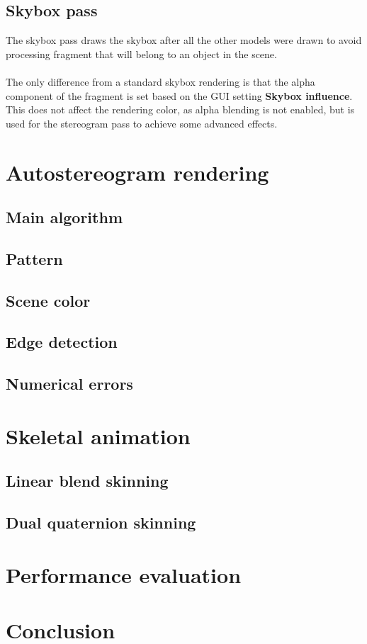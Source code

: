 \documentclass[12pt, a4paper]{article}
\begin{document}
\subsection{Skybox pass}
The skybox pass draws the skybox after all the other models were drawn to avoid processing fragment that will belong to an object
in the scene.\\\\
The only difference from a standard skybox rendering is that the alpha component of the fragment is set based
on the GUI setting \textbf{Skybox influence}. This does not affect the rendering color, as alpha blending is not enabled, but
is used for the stereogram pass to achieve some advanced effects.

\section{Autostereogram rendering}
\subsection{Main algorithm}

\subsection{Pattern}

\subsection{Scene color}

\subsection{Edge detection}

\subsection{Numerical errors}

\section{Skeletal animation}

\subsection{Linear blend skinning}

\subsection{Dual quaternion skinning}

\section{Performance evaluation}

\section{Conclusion}
\end{document}

